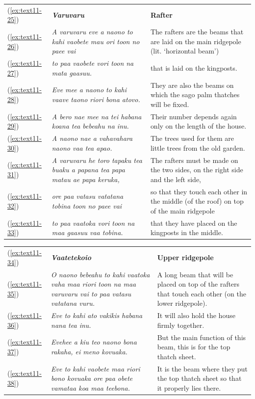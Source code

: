 \documentclass[output=paper]{langscibook}
\begin{document}
\begin{xltabular}{\textwidth}{lXX}
    (\ref{ex:text11-25})&\textit{\textbf{Varuvaru}}&\textbf{Rafter}\\
    (\ref{ex:text11-26})&\textit{A varuvaru eve a naono to kahi vaobete mau ori toon no paee vai}&The rafters are the beams that are laid on the main ridgepole (lit. `horizontal beam')\\
    (\ref{ex:text11-27})&\textit{to paa vaobete vori toon na mata gaasuu.}&that is laid on the kingposts.\\
    (\ref{ex:text11-28})&\textit{Eve mee a naono to kahi vaave taono riori bona atovo.}&They are also the beams on which the sago palm thatches will be fixed.\\
    (\ref{ex:text11-29})&\textit{A bero nae mee na tei habana koana tea bebeahu na inu.}&Their number depends again only on the length of the house.\\
    (\ref{ex:text11-30})&\textit{A naono nae a vahavahara naono vaa tea apao.}&The trees used for them are little trees from the old garden.\\
    (\ref{ex:text11-31})&\textit{A varuvaru he toro tapaku tea buaku a papana tea papa matau ae papa keruka,}&The rafters must be made on the two sides, on the right side and the left side,\\
    (\ref{ex:text11-32})&\textit{ore paa vatasu vatatana tobina toon no paee vai}&so that they touch each other in the middle (of the roof) on top of the main ridgepole\\
    (\ref{ex:text11-33})&\textit{to paa vaatoka vori toon na maa gaasuu vaa tobina.}&that they have placed on the kingposts in the middle.\\
\end{xltabular}
\begin{xltabular}{\textwidth}{lXX}
    (\ref{ex:text11-34})&\textit{\textbf{Vaatetekoio}}&\textbf{Upper ridgepole}\\
    (\ref{ex:text11-35})&\textit{O naono bebeahu to kahi vaatoka vaha maa riori toon na maa varuvaru vai to paa vatasu vatatana vuru.}&A long beam that will be placed on top of the rafters that touch each other (on the lower ridgepole).\\
    (\ref{ex:text11-36})&\textit{Eve to kahi ato vakikis habana nana tea inu.}&It will also hold the house firmly together.\\
    (\ref{ex:text11-37})&\textit{Evehee a kiu teo naono bona rakaha, ei meno kovuaka.}&But the main function of this beam, this is for the top thatch sheet.\\
    (\ref{ex:text11-38})&\textit{Eve to kahi vaobete maa riori bono kovuaka ore paa obete vamataa koa maa teebona.}&It is the beam where they put the top thatch sheet so that it properly lies there.\\
\end{xltabular}
\end{document}
